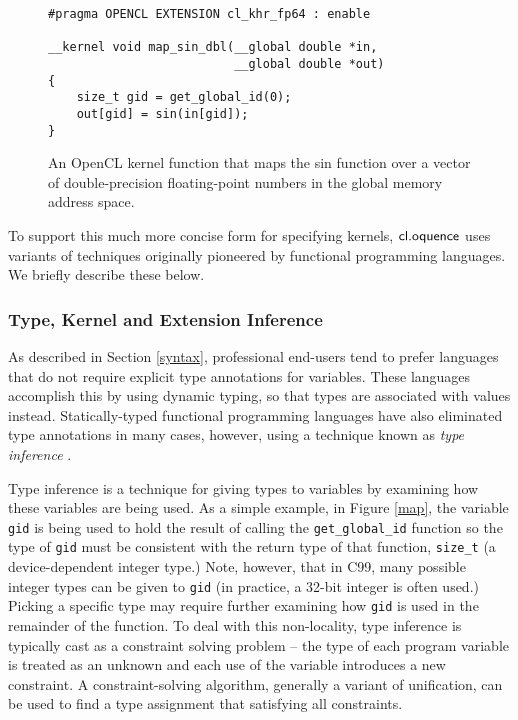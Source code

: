 \documentclass{llncs}
\begin{document}
\begin{figure}
\small{\begin{verbatim}
#pragma OPENCL EXTENSION cl_khr_fp64 : enable

__kernel void map_sin_dbl(__global double *in, 
                          __global double *out) 
{
    size_t gid = get_global_id(0);
    out[gid] = sin(in[gid]);
}
\end{verbatim}}
\caption{An OpenCL kernel function that maps the sin function over a vector of double-precision floating-point numbers in the global memory address space.}
\label{mapsinint}
\end{figure}


To support this much more concise form for specifying kernels, $\textsf{cl.oquence}$ uses variants of techniques originally  pioneered by functional programming languages. We briefly describe these below.

\subsubsection{Type, Kernel and Extension Inference}
As described in Section \ref{syntax}, professional end-users tend to prefer languages that do not require explicit type annotations for variables. These languages accomplish this by using dynamic typing, so that types are associated with values instead. Statically-typed functional programming languages have also eliminated type annotations in many cases, however, using a technique known as {\it type inference} \cite{tapl}. 

Type inference is a technique for giving types to variables by examining how these variables are being used. As a simple example, in Figure \ref{map}, the variable \verb|gid| is being used to hold the result of calling the \verb|get_global_id| function so the type of \verb|gid| must be consistent with the return type of that function, \verb|size_t| (a device-dependent integer type.) Note, however, that in C99, many possible integer types can be given to \verb|gid| (in practice, a 32-bit integer is often used.) Picking a specific type may require further examining how \verb|gid| is used in the remainder of the function. 
To deal with this non-locality, type inference is typically cast as a constraint solving problem -- the type of each program variable is treated as an unknown and each use of the variable introduces a new constraint. A constraint-solving algorithm, generally a variant of unification, can be used to find a type assignment that satisfying all constraints.
\end{document}
